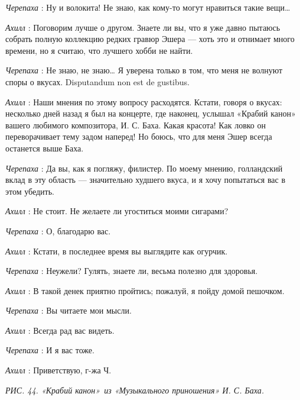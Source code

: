 \emph{Черепаха} : Ну и волокита! Не знаю, как кому-то могут нравиться такие вещи\ldots{}

\emph{Ахилл} : Поговорим лучше о другом. Знаете ли вы, что я уже давно пытаюсь собрать полную коллекцию редких гравюр Эшера --- хоть это и отнимает много времени, но я считаю, что лучшего хобби не найти.

\emph{Черепаха} : Не знаю, не знаю\ldots{} Я уверена только в том, что меня не волнуют споры о вкусах. Disputandum non est de gustibus.

\emph{Ахилл} : Наши мнения по этому вопросу расходятся. Кстати, говоря о вкусах: несколько дней назад я был на концерте, где наконец, услышал «Крабий канон» вашего любимого композитора, И. С. Баха. Какая красота! Как ловко он переворачивает тему задом наперед! Но боюсь, что для меня Эшер всегда останется выше Баха.

\emph{Черепаха} : Да вы, как я погляжу, филистер. По моему мнению, голландский вклад в эту область --- значительно худшего вкуса, и я хочу попытаться вас в этом убедить.

\emph{Ахилл} : Не стоит. Не желаете ли угоститься моими сигарами?

\emph{Черепаха} : О, благодарю вас.

\emph{Ахилл} : Кстати, в последнее время вы выглядите как огурчик.

\emph{Черепаха} : Неужели? Гулять, знаете ли, весьма полезно для здоровья.

\emph{Ахилл} : В такой денек приятно пройтись; пожалуй, я пойду домой пешочком.

\emph{Черепаха} : Вы читаете мои мысли.

\emph{Ахилл} : Всегда рад вас видеть.

\emph{Черепаха} : И я вас тоже.

\emph{Ахилл} : Приветствую, г-жа Ч.

\emph{РИС. 44. «Крабий канон»~из «Музыкального приношения» И. С. Баха.}

